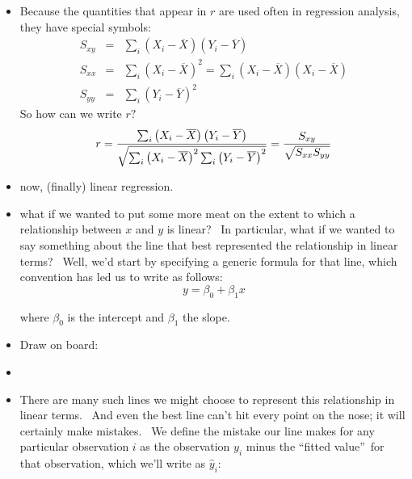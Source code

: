 \documentclass[11pt]{article}
\begin{document}
\begin{itemize}
\item Because the quantities that appear in $r$ are used often in regression
analysis, they have special symbols: 
\begin{eqnarray*}
S_{xy} &=&\sum\nolimits_{i}\left( X_{i}-\overline{X}\right) \left( Y_{i}-%
\overline{Y}\right) \\
S_{xx} &=&\sum\nolimits_{i}\left( X_{i}-\overline{X}\right)
^{2}=\sum\nolimits_{i}\left( X_{i}-\overline{X}\right) \left( X_{i}-%
\overline{X}\right) \\
S_{yy} &=&\sum\nolimits_{i}\left( Y_{i}-\overline{Y}\right) ^{2}
\end{eqnarray*}%
So how can we write $r?$%
\begin{equation*}
r=\frac{\sum\nolimits_{i}\left( X_{i}-\overline{X}\right) \left( Y_{i}-%
\overline{Y}\right) }{\sqrt{\sum\nolimits_{i}\left( X_{i}-\overline{X}%
\right) ^{2}\sum\nolimits_{i}\left( Y_{i}-\overline{Y}\right) ^{2}}}=\frac{%
S_{xy}}{\sqrt{S_{xx}S_{yy}}}
\end{equation*}

\item now, (finally) linear regression.

\item what if we wanted to put some more meat on the extent to which a
relationship between $x$ and $y$ is linear? \ In particular, what if we
wanted to say something about the line that best represented the
relationship in linear terms? \ Well, we'd start by specifying a generic
formula for that line, which convention has led us to write as follows:%
\begin{equation*}
y=\beta _{0}+\beta _{1}x
\end{equation*}

where $\beta _{0}$ is the intercept and $\beta _{1}$ the slope.

\item Draw on board:

\item {}

\item There are many such lines we might choose to represent this
relationship in linear terms. \ And even the best line can't hit every point
on the nose; it will certainly make mistakes. \ We define the mistake our
line makes for any particular observation $i$ as the observation $y_{i}$
minus the \textquotedblleft fitted value\textquotedblright\ for that
observation, which we'll write as $\widehat{y}_{i}:$


\end{itemize}
\end{document}
